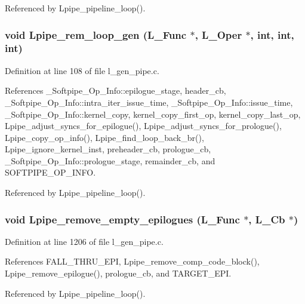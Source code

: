 Referenced by Lpipe\_\-pipeline\_\-loop().
\subsubsection{\setlength{\rightskip}{0pt plus 5cm}void Lpipe\_\-rem\_\-loop\_\-gen (L\_\-Func $\ast$, L\_\-Oper $\ast$, int, int, int)}\label{l__gen__pipe_8h_416f050f19c7a933adf9fe1d4102d309}




Definition at line 108 of file l\_\-gen\_\-pipe.c.

References \_\-Softpipe\_\-Op\_\-Info::epilogue\_\-stage, header\_\-cb, \_\-Softpipe\_\-Op\_\-Info::intra\_\-iter\_\-issue\_\-time, \_\-Softpipe\_\-Op\_\-Info::issue\_\-time, \_\-Softpipe\_\-Op\_\-Info::kernel\_\-copy, kernel\_\-copy\_\-first\_\-op, kernel\_\-copy\_\-last\_\-op, Lpipe\_\-adjust\_\-syncs\_\-for\_\-epilogue(), Lpipe\_\-adjust\_\-syncs\_\-for\_\-prologue(), Lpipe\_\-copy\_\-op\_\-info(), Lpipe\_\-find\_\-loop\_\-back\_\-br(), Lpipe\_\-ignore\_\-kernel\_\-inst, preheader\_\-cb, prologue\_\-cb, \_\-Softpipe\_\-Op\_\-Info::prologue\_\-stage, remainder\_\-cb, and SOFTPIPE\_\-OP\_\-INFO.

Referenced by Lpipe\_\-pipeline\_\-loop().
\subsubsection{\setlength{\rightskip}{0pt plus 5cm}void Lpipe\_\-remove\_\-empty\_\-epilogues (L\_\-Func $\ast$, L\_\-Cb $\ast$)}\label{l__gen__pipe_8h_d0580a626aeebbf86ad383faecbde955}




Definition at line 1206 of file l\_\-gen\_\-pipe.c.

References FALL\_\-THRU\_\-EPI, Lpipe\_\-remove\_\-comp\_\-code\_\-block(), Lpipe\_\-remove\_\-epilogue(), prologue\_\-cb, and TARGET\_\-EPI.

Referenced by Lpipe\_\-pipeline\_\-loop().